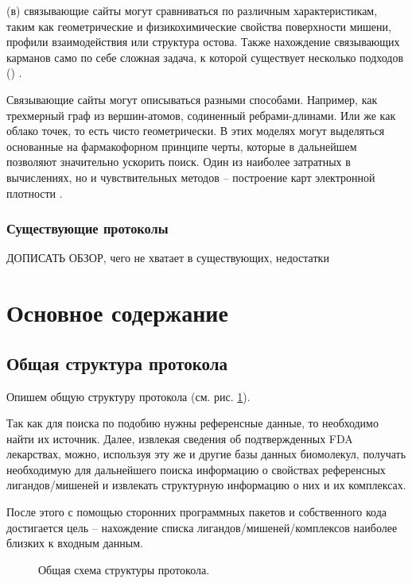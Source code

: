 \documentclass[a4paper,14pt]{article}         %
\begin{document}
(в) связывающие сайты могут сравниваться по различным характеристикам, таким как геометрические и физикохимические свойства поверхности мишени, профили взаимодействия или структура остова. Также нахождение связывающих карманов само по себе сложная задача, к которой существует несколько подходов () \cite{Ehrt2016}. 

Связывающие сайты могут описываться разными способами. Например, как трехмерный граф из вершин-атомов, содиненный ребрами-длинами. Или же как облако точек, то есть чисто геометрически. В этих моделях могут выделяться основанные на фармакофорном принципе черты, которые в дальнейшем позволяют значительно ускорить поиск. Один из наиболее затратных в вычислениях, но и чувствительных методов -- построение карт электронной плотности \cite{Ehrt2016}.
\cite{Cabrera}
\cite{Brylinski}
\cite{Govindaraj2018}
\subsubsection{Существующие протоколы}
\color{orange} ДОПИСАТЬ ОБЗОР, чего не хватает в существующих, недостатки\cite{Chartier2017}
\color{black}


\newpage
\section{Основное содержание}
\subsection{Общая структура протокола}
Опишем общую структуру протокола (см. рис. \ref{structure}).

Так как для поиска по подобию нужны референсные данные, то необходимо найти их источник. Далее, извлекая сведения об подтвержденных FDA лекарствах, можно, используя эту же и другие базы данных биомолекул, получать необходимую для дальнейшего поиска информацию о свойствах референсных лигандов/мишеней и извлекать структурную информацию о них и их комплексах.

После этого с помощью сторонних программных пакетов и собственного кода достигается цель -- нахождение списка лигандов/мишеней/комплексов наиболее близких к входным данным.


\begin{figure}
	\begin{minipage}[!ht]{1\linewidth}
		\caption{Общая схема структуры протокола.}
		\label{structure}
	\end{minipage}
\end{figure}
\end{document}
